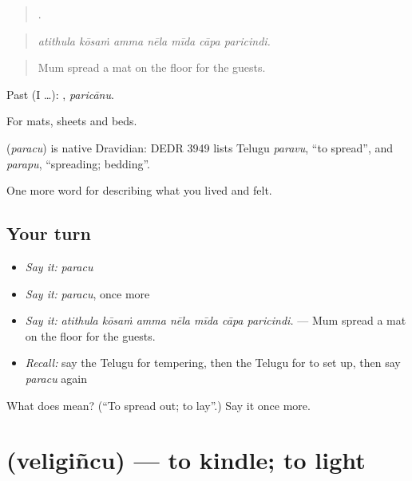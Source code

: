 \begin{quote}
      .
\end{quote}

\begin{quote}
\emph{atithula kōsaṁ amma nēla mīda cāpa paricindi.}
\end{quote}

\begin{quote}
Mum spread a mat on the floor for the guests.
\end{quote}

Past (I …): , \emph{paricānu}.

For mats, sheets and beds.

\begin{cousinweb}
\textbf{} (\emph{paracu}) is native Dravidian: DEDR 3949 lists Telugu \emph{paravu}, \textquotedblleft{}to spread\textquotedblright{}, and \emph{parapu}, \textquotedblleft{}spreading; bedding\textquotedblright{}.
\end{cousinweb}

\begin{grammarlens}[title={What you've built}]
One more word for describing what you lived and felt.
\end{grammarlens}

\subsection*{Your turn}
\begin{itemize}
\raggedright
  \item \emph{Say it:} \emph{paracu}
  \item \emph{Say it:} \emph{paracu}, once more
  \item \emph{Say it:} \emph{atithula kōsaṁ amma nēla mīda cāpa paricindi.} — Mum spread a mat on the floor for the guests.
  \item \emph{Recall:} say the Telugu for tempering, then the Telugu for to set up, then say \emph{paracu} again
\end{itemize}

\begin{tcolorbox}[breakable,colback=teal!4,colframe=teal!35!black,title={Before you move on}]
What does  mean? (\textquotedblleft{}To spread out; to lay\textquotedblright{}.) Say it once more.
\end{tcolorbox}
\section[\texorpdfstring{\te{వెలిగించు} (veligiñcu)}{వెలిగించు (veligiñcu)}]{ (veligiñcu) — to kindle; to light}

